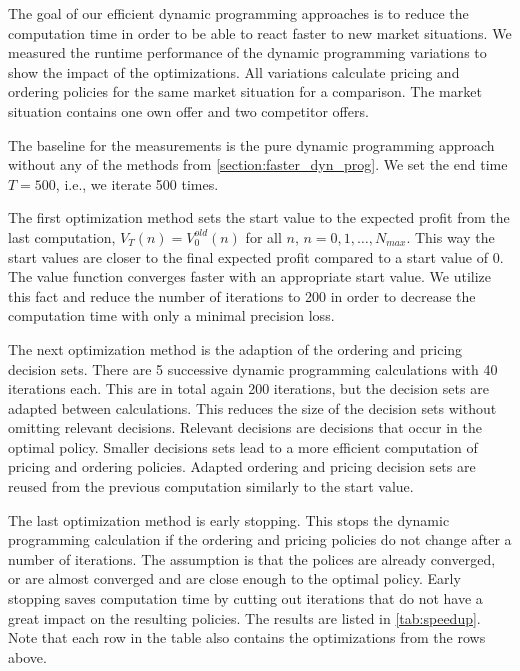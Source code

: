 The goal of our efficient dynamic programming approaches is to reduce the computation time in order to be able to react faster to new market situations.
We measured the runtime performance of the dynamic programming variations to show the impact of the optimizations.
All variations calculate pricing and ordering policies for the same market situation for a comparison.
The market situation contains one own offer and two competitor offers.

The baseline for the measurements is the pure dynamic programming approach without any of the methods from \cref{section:faster_dyn_prog}.
We set the end time $T = 500$, i.e., we iterate 500 times.

The first optimization method sets the start value to the expected profit from the last computation, $V_T(n) = V^{old}_0(n)$ for all $n$, $n=0, 1, \ldots, N_{max}$.
This way the start values are closer to the final expected profit compared to a start value of 0.
The value function converges faster with an appropriate start value.
We utilize this fact and reduce the number of iterations to 200 in order to decrease the computation time with only a minimal precision loss.

The next optimization method is the adaption of the ordering and pricing decision sets.
There are 5 successive dynamic programming calculations with 40 iterations each.
This are in total again 200 iterations, but the decision sets are adapted between calculations.
This reduces the size of the decision sets without omitting relevant decisions.
Relevant decisions are decisions that occur in the optimal policy.
Smaller decisions sets lead to a more efficient computation of pricing and ordering policies.
Adapted ordering and pricing decision sets are reused from the previous computation similarly to the start value.

The last optimization method is early stopping.
This stops the dynamic programming calculation if the ordering and pricing policies do not change after a number of iterations.
The assumption is that the polices are already converged, or are almost converged and are close enough to the optimal policy.
Early stopping saves computation time by cutting out iterations that do not have a great impact on the resulting policies.
The results are listed in \cref{tab:speedup}.
Note that each row in the table also contains the optimizations from the rows above.

